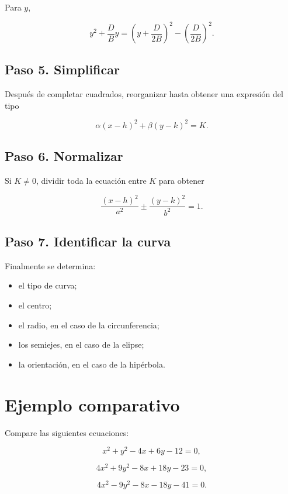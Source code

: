 \documentclass[12pt]{article}
\theoremstyle{plain}
\theoremstyle{definition}
\theoremstyle{remark}
\begin{document}
{Para \(y\),

\[
y^2+\frac{D}{B}y
=
\left(
y+\frac{D}{2B}
\right)^2
-
\left(
\frac{D}{2B}
\right)^2.
\]
\subsection*{Paso 5. Simplificar}
Después de completar cuadrados, reorganizar hasta obtener una expresión
del tipo

\[
\alpha(x-h)^2+\beta(y-k)^2=K.
\]

\subsection*{Paso 6. Normalizar}

Si \(K\neq0\), dividir toda la ecuación entre \(K\) para obtener

\[
\frac{(x-h)^2}{a^2}
\pm
\frac{(y-k)^2}{b^2}
=
1.
\]
\subsection*{Paso 7. Identificar la curva}
Finalmente se determina:

\begin{itemize}
    \item el tipo de curva;
    \item el centro;
    \item el radio, en el caso de la circunferencia;
    \item los semiejes, en el caso de la elipse;
    \item la orientación, en el caso de la hipérbola.
\end{itemize}

\section*{Ejemplo comparativo}

Compare las siguientes ecuaciones:

\[
x^2+y^2-4x+6y-12=0,
\]

\[
4x^2+9y^2-8x+18y-23=0,
\]

\[
4x^2-9y^2-8x-18y-41=0.
\]

}
\end{document}
